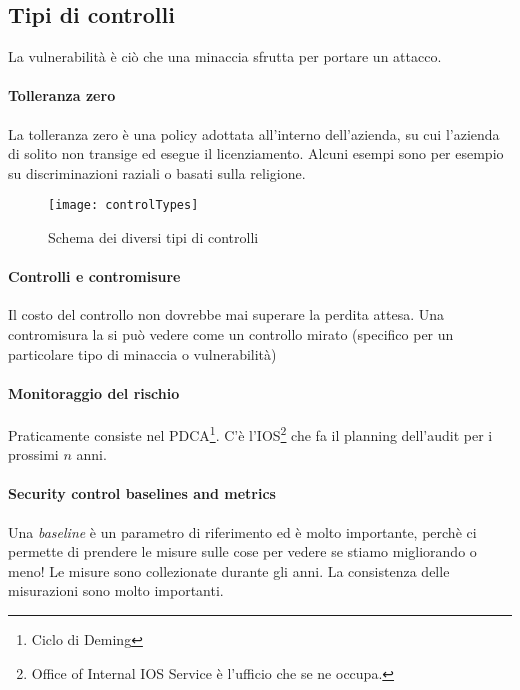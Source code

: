 \subsection{Tipi di controlli}

La vulnerabilità è ciò che una minaccia sfrutta per portare un attacco.

\paragraph*{Tolleranza zero}
La tolleranza zero è una policy adottata all'interno dell'azienda, su cui
l'azienda di solito non transige ed esegue il licenziamento. Alcuni esempi sono
per esempio su discriminazioni raziali o basati sulla religione.

\begin{figure}[H]
 \centering
 \texttt{[image: controlTypes]}
 \caption{Schema dei diversi tipi di controlli}
\end{figure}



\paragraph*{Controlli e contromisure}

Il costo del controllo non dovrebbe mai superare la perdita attesa.
Una contromisura la si può vedere come un controllo mirato (specifico per un
particolare tipo di minaccia o vulnerabilità)

\paragraph*{Monitoraggio del rischio}

Praticamente consiste nel PDCA\footnote{Ciclo di Deming}.
C'è l'IOS\footnote{Office of Internal IOS Service è l'ufficio che se ne occupa.}
che fa il planning dell'audit per i prossimi $n$ anni.


\paragraph*{Security control baselines and metrics}

Una \textit{baseline} è un parametro di riferimento ed è molto importante,
perchè ci permette di prendere le misure sulle cose per vedere se stiamo
migliorando o meno!
Le misure sono collezionate durante gli anni. La consistenza delle misurazioni
sono molto importanti.

